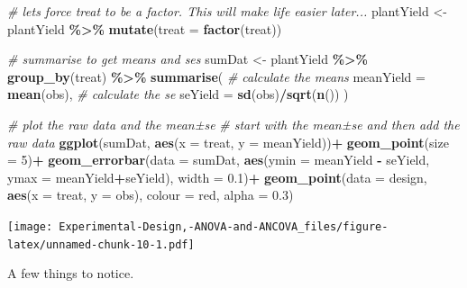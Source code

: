 \documentclass[
]{book}
\newenvironment{Shaded}{\begin{snugshade}}{\end{snugshade}}
\newcommand{\AttributeTok}[1]{\textcolor[rgb]{0.13,0.29,0.53}{#1}}
\newcommand{\CommentTok}[1]{\textcolor[rgb]{0.56,0.35,0.01}{\textit{#1}}}
\newcommand{\DecValTok}[1]{\textcolor[rgb]{0.00,0.00,0.81}{#1}}
\newcommand{\FloatTok}[1]{\textcolor[rgb]{0.00,0.00,0.81}{#1}}
\newcommand{\FunctionTok}[1]{\textcolor[rgb]{0.13,0.29,0.53}{\textbf{#1}}}
\newcommand{\NormalTok}[1]{#1}
\newcommand{\OtherTok}[1]{\textcolor[rgb]{0.56,0.35,0.01}{#1}}
\newcommand{\SpecialCharTok}[1]{\textcolor[rgb]{0.81,0.36,0.00}{\textbf{#1}}}
\newcommand{\StringTok}[1]{\textcolor[rgb]{0.31,0.60,0.02}{#1}}
\begin{document}
\begin{Shaded}
\begin{Highlighting}[]
\CommentTok{\# let\textquotesingle{}s force treat to be a factor.  This will make life easier later...}
\NormalTok{plantYield }\OtherTok{\textless{}{-}}\NormalTok{ plantYield }\SpecialCharTok{\%\textgreater{}\%} 
  \FunctionTok{mutate}\NormalTok{(}\AttributeTok{treat =} \FunctionTok{factor}\NormalTok{(treat))}

\CommentTok{\# summarise to get means and ses}
\NormalTok{sumDat }\OtherTok{\textless{}{-}}\NormalTok{ plantYield }\SpecialCharTok{\%\textgreater{}\%} 
  \FunctionTok{group\_by}\NormalTok{(treat) }\SpecialCharTok{\%\textgreater{}\%} 
  \FunctionTok{summarise}\NormalTok{(}
    \CommentTok{\# calculate the means}
    \AttributeTok{meanYield =} \FunctionTok{mean}\NormalTok{(obs),}
    \CommentTok{\# calculate the se}
    \AttributeTok{seYield =} \FunctionTok{sd}\NormalTok{(obs)}\SpecialCharTok{/}\FunctionTok{sqrt}\NormalTok{(}\FunctionTok{n}\NormalTok{())}
\NormalTok{  )}

\CommentTok{\# plot the raw data and the mean±se}
\CommentTok{\# start with the mean±se and then add the raw data}
\FunctionTok{ggplot}\NormalTok{(sumDat, }\FunctionTok{aes}\NormalTok{(}\AttributeTok{x =}\NormalTok{ treat, }\AttributeTok{y =}\NormalTok{ meanYield))}\SpecialCharTok{+}
  \FunctionTok{geom\_point}\NormalTok{(}\AttributeTok{size =} \DecValTok{5}\NormalTok{)}\SpecialCharTok{+}
  \FunctionTok{geom\_errorbar}\NormalTok{(}\AttributeTok{data =}\NormalTok{ sumDat, }\FunctionTok{aes}\NormalTok{(}\AttributeTok{ymin =}\NormalTok{ meanYield }\SpecialCharTok{{-}}\NormalTok{ seYield, }\AttributeTok{ymax =}\NormalTok{ meanYield}\SpecialCharTok{+}\NormalTok{seYield),}
                \AttributeTok{width =} \FloatTok{0.1}\NormalTok{)}\SpecialCharTok{+}
  \FunctionTok{geom\_point}\NormalTok{(}\AttributeTok{data =}\NormalTok{ design, }\FunctionTok{aes}\NormalTok{(}\AttributeTok{x =}\NormalTok{ treat, }\AttributeTok{y =}\NormalTok{ obs), }\AttributeTok{colour =} \StringTok{\textquotesingle{}red\textquotesingle{}}\NormalTok{, }\AttributeTok{alpha =} \FloatTok{0.3}\NormalTok{)}
\end{Highlighting}
\end{Shaded}

\texttt{[image: Experimental-Design,-ANOVA-and-ANCOVA\_files/figure-latex/unnamed-chunk-10-1.pdf]}

A few things to notice.
\end{document}
